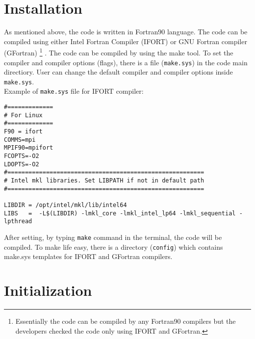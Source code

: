 \documentclass[10pt]{report}
\begin{document}
\chapter{Installation}
As mentioned above,  the code is written in Fortran90 language. 
The code can be compiled using either Intel Fortran Compiler (IFORT) 
or GNU Fortran compiler (GFortran)
\footnote{Essentially the code can be compiled by any Fortran90 compilers but the developers checked the code only using IFORT and GFortran.}
.
The code can be compiled by using the make tool. To set the compiler and compiler options (flags), there is a file ({\tt make.sys}) in the code  main directiory. 
User can change the default compiler and compiler options inside {\tt make.sys}.\\

Example of  {\tt make.sys} file for IFORT compiler:

{\scriptsize 
\begin{verbatim}
#=============                                            
# For Linux                                           
#=============                                             
F90 = ifort
COMMS=mpi
MPIF90=mpifort
FCOPTS=-O2 
LDOPTS=-O2 
#========================================================
# Intel mkl libraries. Set LIBPATH if not in default path
#========================================================

LIBDIR = /opt/intel/mkl/lib/intel64
LIBS   =  -L$(LIBDIR) -lmkl_core -lmkl_intel_lp64 -lmkl_sequential -lpthread
\end{verbatim}
}
After setting, by typing {\tt make} command in the terminal, the code will be compiled.
To make life easy, there is a directory ({\tt config}) which contains make.sys templates for IFORT and GFortran compilers.

\chapter{Initialization}
\end{document}
